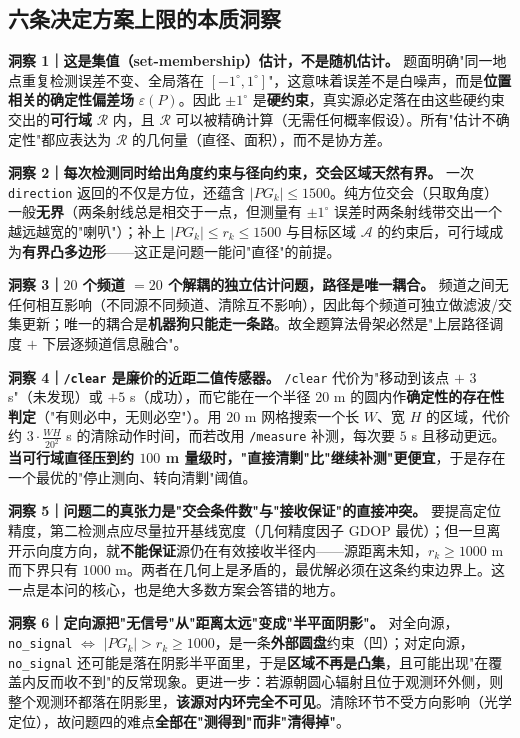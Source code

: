 \documentclass[11pt,a4paper]{ctexart}
\newcommand{\Arena}{\mathcal{A}}
\newcommand{\Reg}{\mathcal{R}}
\begin{document}
\subsection{六条决定方案上限的本质洞察}

\noindent\textbf{洞察 1｜这是集值（set-membership）估计，不是随机估计。}
题面明确"同一地点重复检测误差不变、全局落在 $[-1^\circ,1^\circ]$"，这意味着误差不是白噪声，而是\textbf{位置相关的确定性偏差场} $\varepsilon(P)$。因此 $\pm1^\circ$ 是\textbf{硬约束}，真实源必定落在由这些硬约束交出的\textbf{可行域} $\Reg$ 内，且 $\Reg$ 可以被精确计算（无需任何概率假设）。所有"估计不确定性"都应表达为 $\Reg$ 的几何量（直径、面积），而不是协方差。

\noindent\textbf{洞察 2｜每次检测同时给出角度约束与径向约束，交会区域天然有界。}
一次 \texttt{direction} 返回的不仅是方位，还蕴含 $|PG_k|\le1500$。纯方位交会（只取角度）一般\textbf{无界}（两条射线总是相交于一点，但测量有 $\pm1^\circ$ 误差时两条射线带交出一个越远越宽的"喇叭"）；补上 $|PG_k|\le r_k\le1500$ 与目标区域 $\Arena$ 的约束后，可行域成为\textbf{有界凸多边形}——这正是问题一能问"直径"的前提。

\noindent\textbf{洞察 3｜$20$ 个频道 $=20$ 个解耦的独立估计问题，路径是唯一耦合。}
频道之间无任何相互影响（不同源不同频道、清除互不影响），因此每个频道可独立做滤波/交集更新；唯一的耦合是\textbf{机器狗只能走一条路}。故全题算法骨架必然是"上层路径调度 $+$ 下层逐频道信息融合"。

\noindent\textbf{洞察 4｜\texttt{/clear} 是廉价的近距二值传感器。}
\texttt{/clear} 代价为"移动到该点 $+$ $3$ s"（未发现）或 $+5$ s（成功），而它能在一个半径 $20$ m 的圆内作\textbf{确定性的存在性判定}（"有则必中，无则必空"）。用 $20$ m 网格搜索一个长 $W$、宽 $H$ 的区域，代价约 $3\cdot\frac{WH}{20^2}$ s 的清除动作时间，而若改用 \texttt{/measure} 补测，每次要 $5$ s 且移动更远。\textbf{当可行域直径压到约 $100$ m 量级时，"直接清剿"比"继续补测"更便宜}，于是存在一个最优的"停止测向、转向清剿"阈值。

\noindent\textbf{洞察 5｜问题二的真张力是"交会条件数"与"接收保证"的直接冲突。}
要提高定位精度，第二检测点应尽量拉开基线宽度（几何精度因子 GDOP 最优）；但一旦离开示向度方向，就\textbf{不能保证}源仍在有效接收半径内——源距离未知，$r_k\ge1000$ m 而下界只有 $1000$ m。两者在几何上是矛盾的，最优解必须在这条约束边界上。这一点是本问的核心，也是绝大多数方案会答错的地方。

\noindent\textbf{洞察 6｜定向源把"无信号"从"距离太远"变成"半平面阴影"。}
对全向源，\texttt{no\_signal} $\iff$ $|PG_k|>r_k\ge1000$，是一条\textbf{外部圆盘}约束（凹）；对定向源，\texttt{no\_signal} 还可能是落在阴影半平面里，于是\textbf{区域不再是凸集}，且可能出现"在覆盖内反而收不到"的反常现象。更进一步：若源朝圆心辐射且位于观测环外侧，则整个观测环都落在阴影里，\textbf{该源对内环完全不可见}。清除环节不受方向影响（光学定位），故问题四的难点\textbf{全部在"测得到"而非"清得掉"}。
\end{document}
